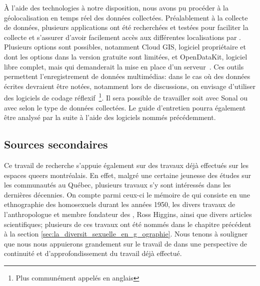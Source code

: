 À l'aide des technologies à notre disposition, nous avons pu procéder à la géolocalisation en temps réel des données collectées.
Préalablement à la collecte de données, plusieurs applications ont été recherchées et testées pour faciliter la collecte et s'assurer d'avoir facilement accès aux différentes localisations par \gps.
Plusieurs options sont possibles, notamment Cloud GIS, logiciel propriétaire et dont les options dans la version gratuite sont limitées, et OpenDataKit, logiciel libre complet, mais qui demanderait la mise en place d'un serveur~\citep{OpenDataKit2014}.
Ces outils permettent l'enregistrement de données multimédias: dans le cas où des données écrites devraient être notées, notamment lors de discussions, on envisage d'utiliser des logiciels de codage réflexif~\footnote{Plus communément appelés en anglais \cadqas}.
Il sera possible de travailler soit avec Sonal ou avec \rqda{} selon le type de données collectées.
Le guide d'entretien pourra également être analysé par la suite à l'aide des logiciels nommés précédemment.

\subsection{Sources secondaires}
\label{sub:sources_secondaires}
Ce travail de recherche s'appuie également sur des travaux déjà effectués sur les espaces queers montréalais.
En effet, malgré une certaine jeunesse des études sur les communautés \lgbt{} au Québec, plusieurs travaux s'y sont intéressés dans les dernières décennies.
On compte parmi ceux-ci le mémoire de \cite{Leznoff1954} qui consiste en une ethnographie des homosexuels durant les années 1950, les divers travaux de l'anthropologue et membre fondateur des \agq{}, Ross Higgins, ainsi que divers articles scientifiques; plusieurs de ces travaux ont été nommés dans le chapitre précédent à la section \ref{sec:la_diversit_sexuelle_en_g_ographie}.
Nous tenons à souligner que nous nous appuierons grandement sur le travail de \citep{Giraud2014} dans une perspective de continuité et d'approfondissement du travail déjà effectué.

